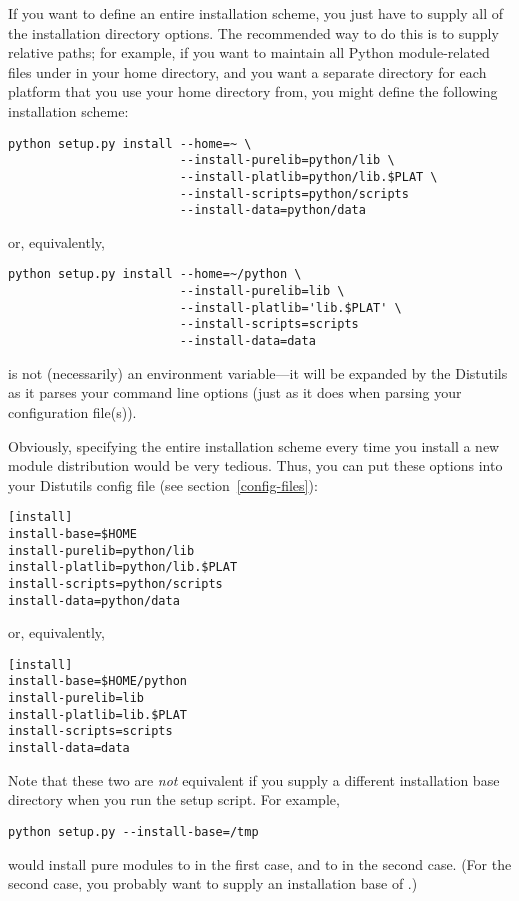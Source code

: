 \documentclass{howto}
\begin{document}
If you want to define an entire installation scheme, you just have to
supply all of the installation directory options.  The recommended way
to do this is to supply relative paths; for example, if you want to
maintain all Python module-related files under  in your
home directory, and you want a separate directory for each platform that
you use your home directory from, you might define the following
installation scheme:
\begin{verbatim}
python setup.py install --home=~ \
                        --install-purelib=python/lib \
                        --install-platlib=python/lib.$PLAT \
                        --install-scripts=python/scripts
                        --install-data=python/data
\end{verbatim}
or, equivalently,
\begin{verbatim}
python setup.py install --home=~/python \
                        --install-purelib=lib \
                        --install-platlib='lib.$PLAT' \
                        --install-scripts=scripts
                        --install-data=data
\end{verbatim}
\code{\$PLAT} is not (necessarily) an environment variable---it will be
expanded by the Distutils as it parses your command line options (just
as it does when parsing your configuration file(s)).

Obviously, specifying the entire installation scheme every time you
install a new module distribution would be very tedious.  Thus, you can
put these options into your Distutils config file (see
section~\ref{config-files}):
\begin{verbatim}
[install]
install-base=$HOME
install-purelib=python/lib
install-platlib=python/lib.$PLAT
install-scripts=python/scripts
install-data=python/data
\end{verbatim}
or, equivalently,
\begin{verbatim}
[install]
install-base=$HOME/python
install-purelib=lib
install-platlib=lib.$PLAT
install-scripts=scripts
install-data=data
\end{verbatim}
Note that these two are \emph{not} equivalent if you supply a different
installation base directory when you run the setup script.  For example,
\begin{verbatim}
python setup.py --install-base=/tmp
\end{verbatim}
would install pure modules to  in the first
case, and to \filevar{/tmp/lib} in the second case.  (For the second
case, you probably want to supply an installation base of
.)
\end{document}
